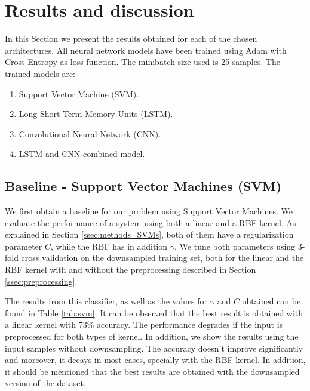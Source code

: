\documentclass[10pt,conference,compsocconf]{IEEEtran}
\begin{document}
\section{Results and discussion} %
\label{sec:results}
	In this Section we present the results obtained for each of the chosen architectures. All neural network models have been trained using Adam with Cross-Entropy as loss function. The minibatch size used is 25 samples. The trained models are:
	\begin{enumerate}
	    \item Support Vector Machine (SVM).
	    \item Long Short-Term Memory Units (LSTM).
	    \item Convolutional Neural Network (CNN).
	    \item LSTM and CNN combined model.
	\end{enumerate}
	
    \subsection{Baseline - Support Vector Machines (SVM)} %
    \label{ssec:SVMs}
    We first obtain a baseline for our problem using Support Vector Machines. We evaluate the performance of a system using both a linear and a RBF kernel.  As explained in Section \ref{ssec:methods_SVMs}, both of them have a regularization parameter $C$, while the RBF has in addition $\gamma$. We tune both parameters using 3-fold cross validation on the downsampled training set, both for the linear and the RBF kernel with and without the preprocessing described in Section \ref{ssec:preprocessing}. 
    
    The results from this classifier, as well as the values for $\gamma$ and $C$ obtained can be found in Table \ref{tab:svm}. It can be observed that the best result is obtained with a linear kernel with 73\% accuracy. The performance degrades if the input is preprocessed for both types of kernel. In addition, we show the results using the input samples without downsampling. The accuracy doesn't improve significantly and moreover, it decays in most cases, specially with the RBF kernel. In addition, it should be mentioned that the best results are obtained with the downsampled version of the dataset.
    
\end{document}
